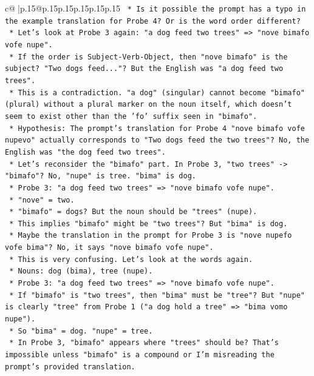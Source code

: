 \documentclass{article}
\begin{document}
{\begin{supertabular}{c@{$\;$}|p{.15\linewidth}@{}p{.15\linewidth}p{.15\linewidth}p{.15\linewidth}p{.15\linewidth}p{.15\linewidth}}
{{{\texttt{        *   Is it possible the prompt has a typo in the example translation for Probe 4? Or is the word order different?} \\
\texttt{        *   Let's look at Probe 3 again: "a dog feed two trees" => "nove bimafo vofe nupe".} \\
\texttt{        *   If the order is Subject{-}Verb{-}Object, then "nove bimafo" is the subject? "Two dogs feed..."? But the English was "a dog feed two trees".} \\
\texttt{        *   This is a contradiction. "a dog" (singular) cannot become "bimafo" (plural) without a plural marker on the noun itself, which doesn't seem to exist other than the 'fo' suffix seen in "bimafo".} \\
\texttt{        *   Hypothesis: The prompt's translation for Probe 4 "nove bimafo vofe nupevo" actually corresponds to "Two dogs feed the two trees"? No, the English was "the dog feed two trees".} \\
\texttt{        *   Let's reconsider the "bimafo" part. In Probe 3, "two trees" {-}> "bimafo"? No, "nupe" is tree. "bima" is dog.} \\
\texttt{        *   Probe 3: "a dog feed two trees" => "nove bimafo vofe nupe".} \\
\texttt{            *   "nove" = two.} \\
\texttt{            *   "bimafo" = dogs? But the noun should be "trees" (nupe).} \\
\texttt{            *   This implies "bimafo" might be "two trees"? But "bima" is dog.} \\
\texttt{            *   Maybe the translation in the prompt for Probe 3 is "nove nupefo vofe bima"? No, it says "nove bimafo vofe nupe".} \\
\texttt{            *   This is very confusing. Let's look at the words again.} \\
\texttt{            *   Nouns: dog (bima), tree (nupe).} \\
\texttt{            *   Probe 3: "a dog feed two trees" => "nove bimafo vofe nupe".} \\
\texttt{                *   If "bimafo" is "two trees", then "bima" must be "tree"? But "nupe" is clearly "tree" from Probe 1 ("a dog hold a tree" => "bima vomo nupe").} \\
\texttt{                *   So "bima" = dog. "nupe" = tree.} \\
\texttt{                *   In Probe 3, "bimafo" appears where "trees" should be? That's impossible unless "bimafo" is a compound or I'm misreading the prompt's provided translation.} \\
}}}
\end{supertabular}}
\end{document}
